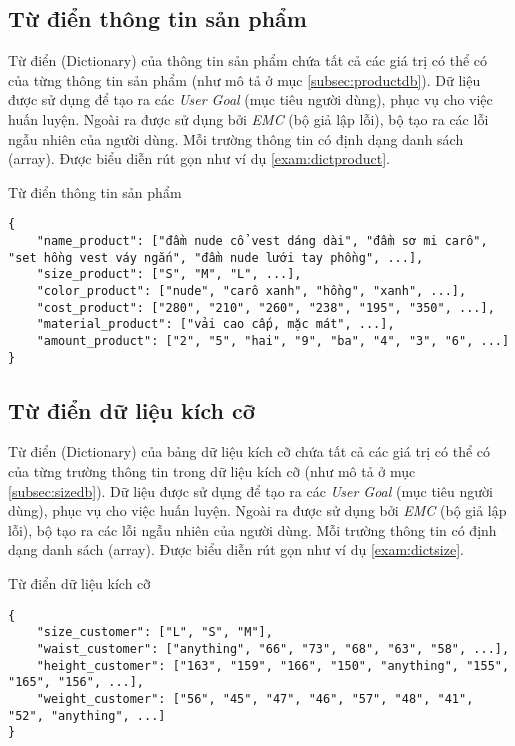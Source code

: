 \subsection{Từ điển thông tin sản phẩm}
Từ điển (Dictionary) của thông tin sản phẩm chứa tất cả các giá trị
có thể có của từng thông tin sản phẩm (như mô tả ở mục
\ref{subsec:productdb}). Dữ liệu được sử dụng để tạo ra các
\textit{User Goal} (mục tiêu người dùng), phục vụ cho việc
huấn luyện. Ngoài ra được sử dụng bởi \textit{EMC} (bộ giả lập lỗi),
bộ tạo ra các lỗi ngẫu nhiên của người dùng. Mỗi trường thông tin
có định dạng danh sách (array). Được biểu diễn rút gọn như ví dụ
\ref{exam:dictproduct}.

\renewcommand{\textboxenvname}{Ví dụ}
\begin{textbox}{Từ điển thông tin sản phẩm}
\begin{Verbatim}[breaklines=true, breakanywhere=true]
{
    "name_product": ["đầm nude cổ vest dáng dài", "đầm sơ mi carô", "set hồng vest váy ngắn", "đầm nude lưới tay phồng", ...],
    "size_product": ["S", "M", "L", ...],
    "color_product": ["nude", "carô xanh", "hồng", "xanh", ...],
    "cost_product": ["280", "210", "260", "238", "195", "350", ...],
    "material_product": ["vải cao cấp, mặc mát", ...],
    "amount_product": ["2", "5", "hai", "9", "ba", "4", "3", "6", ...]
}
\end{Verbatim}
\end{textbox}

\subsection{Từ điển dữ liệu kích cỡ}
Từ điển (Dictionary) của bảng dữ liệu kích cỡ chứa tất cả các giá trị
có thể có của từng trường thông tin trong dữ liệu kích cỡ (như mô tả
ở mục \ref{subsec:sizedb}). Dữ liệu được sử dụng để tạo ra các
\textit{User Goal} (mục tiêu người dùng), phục vụ cho việc huấn luyện.
Ngoài ra được sử dụng bởi \textit{EMC} (bộ giả lập lỗi), bộ tạo ra
các lỗi ngẫu nhiên của người dùng. Mỗi trường thông tin có định dạng
danh sách (array). Được biểu diễn rút gọn như ví dụ \ref{exam:dictsize}.

\renewcommand{\textboxenvname}{Ví dụ}
\begin{textbox}{Từ điển dữ liệu kích cỡ}
\begin{Verbatim}[breaklines=true, breakanywhere=true]
{
    "size_customer": ["L", "S", "M"],
    "waist_customer": ["anything", "66", "73", "68", "63", "58", ...],
    "height_customer": ["163", "159", "166", "150", "anything", "155", "165", "156", ...],
    "weight_customer": ["56", "45", "47", "46", "57", "48", "41", "52", "anything", ...]
}
\end{Verbatim}
\end{textbox}

